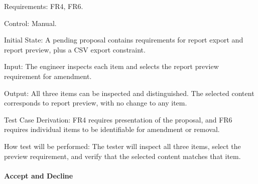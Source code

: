 \documentclass[12pt, titlepage]{article}
\begin{document}
\begin{enumerate}
Requirements: FR4, FR6.

Control: Manual.

Initial State: A pending proposal contains requirements for report export and
report preview, plus a CSV export constraint.

Input: The engineer inspects each item and selects the report preview
requirement for amendment.

Output: All three items can be inspected and distinguished. The selected
content corresponds to report preview, with no change to any item.

Test Case Derivation: FR4 requires presentation of the proposal, and FR6
requires individual items to be identifiable for amendment or removal.

How test will be performed: The tester will inspect all three items, select
the preview requirement, and verify that the selected content matches that
item.

\end{enumerate}

\paragraph{Accept and Decline}
\end{document}
